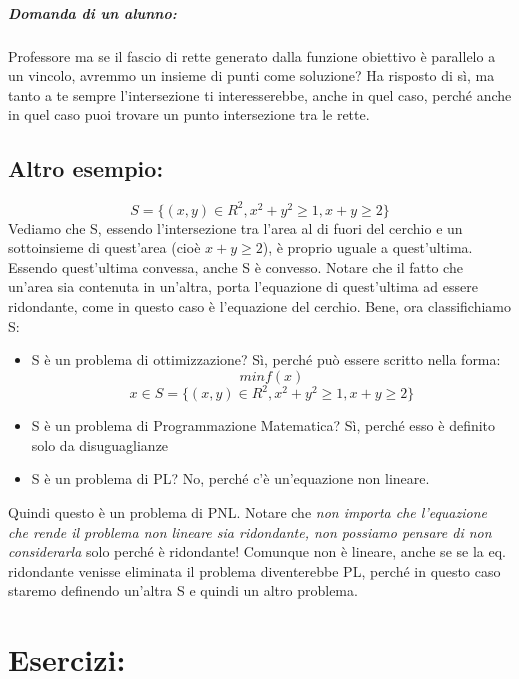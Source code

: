 \subparagraph{Domanda di un alunno:} Professore ma se il fascio di rette generato dalla funzione obiettivo è parallelo a un vincolo, avremmo un insieme di punti come soluzione? Ha risposto di sì, ma tanto a te sempre l'intersezione ti interesserebbe, anche in quel caso, perché anche in quel caso puoi trovare un punto intersezione tra le rette.







\subsection{Altro esempio:}
\begin{equation*}
    S = \{(x,y) \in R^2, x^2 + y^2 \geq 1, x + y \geq 2\}
\end{equation*}
Vediamo che S, essendo l'intersezione tra l'area al di fuori del cerchio e un sottoinsieme di quest'area (cioè  $x + y \geq 2$), è proprio uguale a quest'ultima. Essendo quest'ultima convessa, anche S è convesso. Notare che il fatto che un'area sia contenuta in un'altra, porta l'equazione di quest'ultima ad essere ridondante, come in questo caso è l'equazione del cerchio. Bene, ora classifichiamo S:
\begin{itemize}
    \item S è un problema di ottimizzazione? Sì, perché può essere scritto nella forma:
    \begin{equation*}
        min f(x)
    \end{equation*}
    \begin{equation*}
        x \in S = \{(x,y) \in R^2, x^2 + y^2 \geq 1, x + y \geq 2\}
    \end{equation*}
    \item S è un problema di Programmazione Matematica? Sì, perché esso è definito solo da disuguaglianze
    \item S è un problema di PL? No, perché c'è un'equazione non lineare. 
\end{itemize}
Quindi questo è un problema di PNL. Notare che \textit{non importa che l'equazione che rende il problema non lineare sia ridondante, non possiamo pensare di non considerarla} solo perché è ridondante! Comunque non è lineare, anche se se la eq. ridondante venisse eliminata il problema diventerebbe PL, perché in questo caso staremo definendo un'altra S e quindi un altro problema.


\newpage

\section{Esercizi:} 

